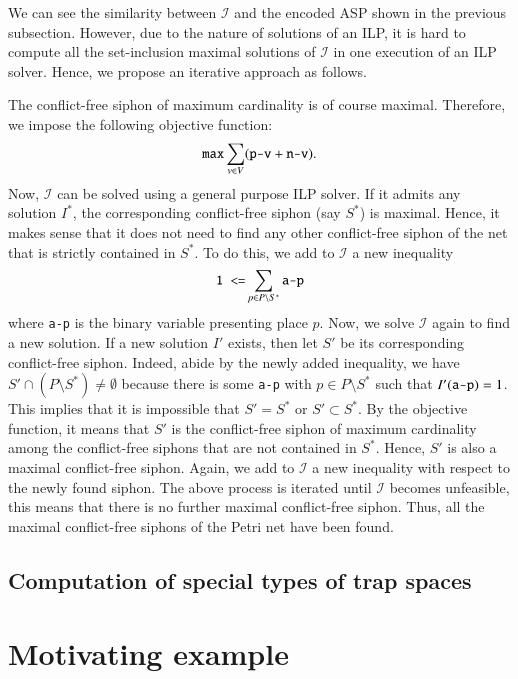 \documentclass[preprint,12pt]{elsarticle}
\begin{document}
We can see the similarity between \(\mathcal{I}\) and the encoded ASP shown in the previous subsection.
However, due to the nature of solutions of an ILP, it is hard to compute all the set-inclusion maximal solutions of \(\mathcal{I}\) in one execution of an ILP solver.
Hence, we propose an iterative approach as follows.

The conflict-free siphon of maximum cardinality is of course maximal.
Therefore, we impose the following objective function:
\[
  \verb|max| \sum_{v \in V}(\verb|p-v| + \verb|n-v|).
\]
Now, \(\mathcal{I}\) can be solved using a general purpose ILP solver.
If it admits any solution \(I^{*}\), the corresponding conflict-free siphon (say \(S^{*}\)) is maximal.
Hence, it makes sense that it does not need to find any other conflict-free siphon of the net that is strictly contained in \(S^{*}\).
To do this, we add to \(\mathcal{I}\) a new inequality
\[
  \verb|1 <=| \sum_{p \in P \setminus S^{*}} \verb|a-p|
\]
where \verb|a-p| is the binary variable presenting place \(p\).
Now, we solve \(\mathcal{I}\) again to find a new solution.
If a new solution \(I'\) exists, then let \(S'\) be its corresponding conflict-free siphon.
Indeed, abide by the newly added inequality, we have \(S' \cap (P \setminus S^{*}) \neq \emptyset\) because there is some \verb|a-p| with \(p \in P \setminus S^{*}\) such that \(I'(\verb|a-p|) = 1\).
This implies that it is impossible that \(S' = S^{*}\) or \(S' \subset S^{*}\).
By the objective function, it means that \(S'\) is the conflict-free siphon of maximum cardinality among the conflict-free siphons that are not contained in \(S^{*}\).
Hence, \(S'\) is also a maximal conflict-free siphon.
Again, we add to \(\mathcal{I}\) a new inequality with respect to the newly found siphon.
The above process is iterated until \(\mathcal{I}\) becomes unfeasible, this means that there is no further maximal conflict-free siphon.
Thus, all the maximal conflict-free siphons of the Petri net have been found.

\subsection{Computation of special types of trap spaces}
\label{subsec:computation_special_ts}

\section{Motivating example}

\end{document}
